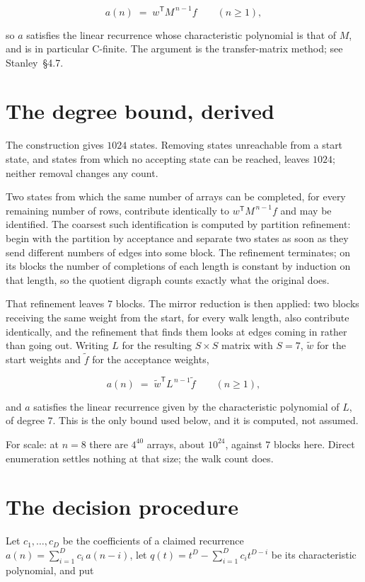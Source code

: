 \documentclass[11pt]{article}
\theoremstyle{definition}
\begin{document}
\[a(n) \;=\; w^{\mathsf T} M^{\,n-1} f \qquad (n \ge 1),\]

so $a$ satisfies the linear recurrence whose characteristic polynomial is that of $M$, and is in particular C-finite. The argument is the transfer-matrix method; see Stanley~\S4.7.

\section{The degree bound, derived}

The construction gives $1024$ states. Removing states unreachable from a start state, and states from which no accepting state can be reached, leaves $1024$; neither removal changes any count.

Two states from which the same number of arrays can be completed, for every remaining number of rows, contribute identically to $w^{\mathsf T}M^{\,n-1}f$ and may be identified. The coarsest such identification is computed by partition refinement: begin with the partition by acceptance and separate two states as soon as they send different numbers of edges into some block. The refinement terminates; on its blocks the number of completions of each length is constant by induction on that length, so the quotient digraph counts exactly what the original does.

That refinement leaves $7$ blocks. The mirror reduction is then applied: two blocks receiving the same weight from the start, for every walk length, also contribute identically, and the refinement that finds them looks at edges coming in rather than going out. Writing $L$ for the resulting $S \times S$ matrix with $S = 7$, $\tilde w$ for the start weights and $\tilde f$ for the acceptance weights,

\[a(n) \;=\; \tilde w^{\mathsf T} L^{\,n-1} \tilde f \qquad (n \ge 1),\]

and $a$ satisfies the linear recurrence given by the characteristic polynomial of $L$, of degree $7$. This is the only bound used below, and it is computed, not assumed.

For scale: at $n = 8$ there are $4^{40}$ arrays, about $10^{24}$, against $7$ blocks here. Direct enumeration settles nothing at that size; the walk count does.

\section{The decision procedure}

Let $c_1,\dots,c_D$ be the coefficients of a claimed recurrence $a(n) = \sum_{i=1}^{D} c_i\,a(n-i)$, let $q(t) = t^{D} - \sum_{i=1}^{D} c_i t^{D-i}$ be its characteristic polynomial, and put
\end{document}
